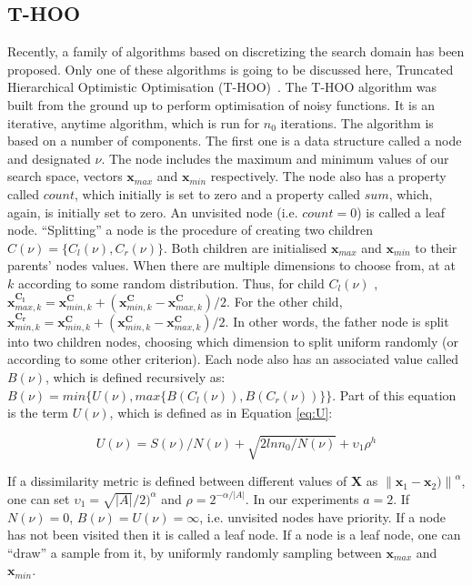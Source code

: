 \documentclass[conference]{IEEEtran}
\begin{document}
\subsection{T-HOO}
Recently, a family of algorithms based on discretizing the search domain has been proposed. Only one of these algorithms is going to be discussed here, Truncated Hierarchical Optimistic Optimisation (T-HOO)~\cite{hoo2011}. The T-HOO algorithm was built from the ground up to perform optimisation of noisy functions. It is an iterative, anytime algorithm, which is run for $n_0$ iterations.  The algorithm is based on a number of components. The first one is a data structure called a node and designated $\nu$. The node includes the maximum and minimum values of our search space, vectors $\bm{x_{\mathit{max}}}$ and $\bm{x_{\mathit{min}}}$ respectively. The node also has a property called $\mathit{count}$, which initially is set to zero and a property called $\mathit{sum}$, which, again, is initially set to zero. An unvisited node (i.e. $\mathit{count}=0$) is called a leaf node.  ``Splitting'' a node is the procedure of creating two children $C(\nu) = \{C_l(\nu),C_r(\nu)\}$. Both children are initialised $\bm{x_{\mathit{max}}}$ and $\bm{x_{\mathit{min}}}$ to their parents' nodes values. When there are multiple dimensions to choose from, at  at $k$ according to some random distribution. Thus, for child $C_l(\nu)$ ,   $\bm{x^{C_l}_{\mathit{max,k}}} =\bm{x^{C}_{\mathit{min,k}}} +  \left(\bm{x^{C}_{\mathit{min,k}}} - \bm{x^{C}_{\mathit{max,k}}}\right)/2 $. For the other child,  $\bm{x^{C_r}_{\mathit{min,k}}} = \bm{x^{C}_{\mathit{min,k}}} +  \left(\bm{x^{C}_{\mathit{min,k}}} - \bm{x^{C}_{\mathit{max,k}}}\right)/2 $. In other words, the father node is split into two children nodes, choosing which dimension to split uniform randomly (or according to some other criterion). Each node also has an associated value called $B(\nu)$, which is defined recursively as:  $B(\nu) = min \{U(\nu),max \{B(C_l(\nu)),B(C_r(\nu))\}\}$. Part of this equation is the term $U(\nu)$, which is defined as in Equation \ref{eq:U}:


\begin{equation}
U(\nu) = S(\nu)/N(\nu) + \sqrt{2ln n_0/N(\nu)} + \upsilon_1 \rho^h
\label{eq:U}
\end{equation}



If a dissimilarity metric is defined between different values of $\bm{X}$ as ${\lVert \bm{x}_1 - \bm{x}_2) \rVert}^\alpha$, one can set $\upsilon_1 =\sqrt{|A|}/2)^\alpha$ and $\rho = 2^{-\alpha/|A|}$. In our experiments $a = 2$. If $N(\nu) = 0$, $B(\nu) = U(\nu) = \infty$, i.e. unvisited nodes have priority. If a node has not been visited then it is called a leaf node. If a node is a leaf node, one can ``draw'' a sample from it, by uniformly randomly sampling between $\bm{x_{\mathit{max}}}$ and $\bm{x_{\mathit{min}}}$.
\end{document}
